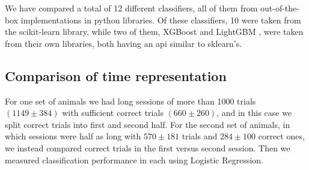 We have compared a total of 12 different classifiers, all of them from out-of-the-box implementations in python libraries. Of these classifiers, 10 were taken from the scikit-learn \cite{scikit-learn} library, while two of them, XGBoost \cite{chen2016xgboost} and LightGBM \cite{ke2017lightgbm}, were taken from their own libraries, both having an api similar to sklearn's.

\subsection{Comparison of time representation}
For one set of animals we had long sessions of more than 1000 trials $(1149 \pm 384)$ with sufficient correct trials $(660 \pm 260)$, and in this case we split correct trials into first and second half. For the second set of animals, in which sessions were half as long with $570 \pm 181$ trials and $284\pm 100$ correct ones, we instead compared correct trials in the first versus second session. Then we measured classification performance in each using Logistic Regression. 




